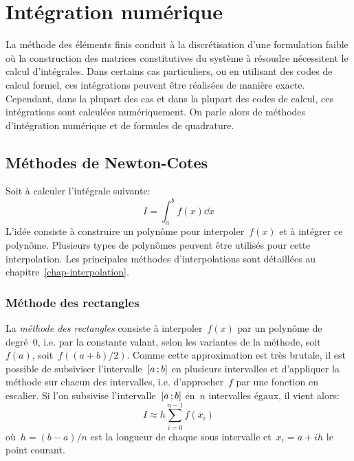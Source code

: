 \chapter{Intégration numérique}\label{chap-quadrature} 
La méthode des éléments finis conduit à la discrétisation d'une formulation faible où la construction des matrices constitutives du système à résoudre nécessitent le calcul d'intégrales. Dans certains cas particuliers, ou en utilisant des codes de calcul formel, ces intégrations peuvent être réalisées de manière exacte. Cependant, dans la plupart des cas et dans la plupart des codes de calcul, ces intégrations sont calculées numériquement. On parle alors de méthodes d'intégration numérique et de formules de quadrature. 
\section{Méthodes de Newton-Cotes}
Soit à calculer l'intégrale suivante: 
\begin{equation}
I=\int_a^b f(x)\dd x
\end{equation}
L'idée consiste à construire un polynôme pour interpoler~$f(x)$ et à intégrer ce polynôme. Plusieurs types de polynômes peuvent être utilisés pour cette interpolation. Les principales méthodes d'interpolations sont détaillées au chapitre~\ref{chap-interpolation}. 
\subsection{Méthode des rectangles}
La \emph{méthode des rectangles} consiste à interpoler~$f(x)$ par un polynôme de degré~$0$, i.e. par la constante valant, selon les variantes de la méthode, soit~$f(a)$, soit~$f((a+b)/2)$. Comme cette approximation est très brutale, il est possible de subsiviser l'intervalle~$\mathopen{[}a\,;b\mathclose{]}$ en plusieurs intervalles et d'appliquer la méthode sur chacun des intervalles, i.e. d'approcher~$f$ par une fonction en escalier. Si l'on subsivise l'intervalle~$\mathopen{[}a\,;b\mathclose{]}$ en~$n$ intervalles égaux, il vient alors: 
\begin{equation}
I\approx h\sum_{i=0}^{n-1} f(x_i)
\end{equation}
où~$h=(b-a)/n$ est la longueur de chaque sous intervalle et~$x_i=a+ih$ le point courant. 
